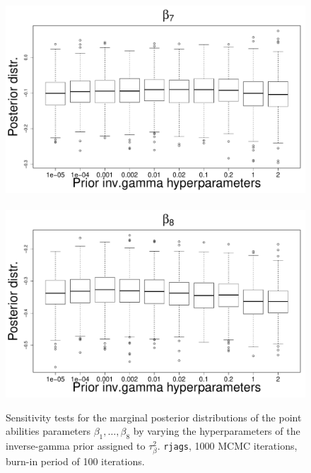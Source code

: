 \documentclass{statsoc}
\numberwithin{figure}{section}
\numberwithin{table}{section}
\begin{document}
\begin{figure}
\includegraphics[scale=0.25]{Sensitivity/beta_7_sensitivity.pdf}~
\includegraphics[scale=0.25]{Sensitivity/beta_8_sensitivity.pdf}\\
\caption{Sensitivity tests for the marginal posterior distributions of the point abilities parameters $\beta_1, \ldots,\beta_8$ by varying the hyperparameters of the inverse-gamma prior assigned to $\tau^2_{\beta}$. {\tt rjags}, 1000 MCMC iterations, burn-in period of 100 iterations.}
\label{figS3}
\end{figure}
\end{document}
